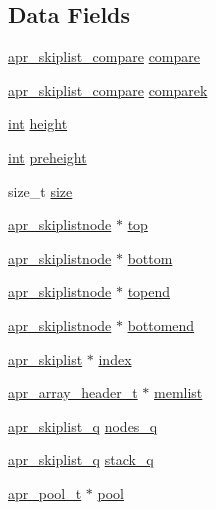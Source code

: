 \subsection*{Data Fields}
\begin{DoxyCompactItemize}
\item 
\hyperlink{group__apr__skiplist_ga873aa114e692e48c6587277680ceba87}{apr\+\_\+skiplist\+\_\+compare} \hyperlink{structapr__skiplist_aba09b0901012efabbd7f1c19ae00b083}{compare}
\item 
\hyperlink{group__apr__skiplist_ga873aa114e692e48c6587277680ceba87}{apr\+\_\+skiplist\+\_\+compare} \hyperlink{structapr__skiplist_a302f3304808bce5de377da20e6cc4206}{comparek}
\item 
\hyperlink{pcre_8txt_a42dfa4ff673c82d8efe7144098fbc198}{int} \hyperlink{structapr__skiplist_a9691b2ecb9bc1c70fba1831c456da92e}{height}
\item 
\hyperlink{pcre_8txt_a42dfa4ff673c82d8efe7144098fbc198}{int} \hyperlink{structapr__skiplist_aac080b07ce26442217a23c40bededd74}{preheight}
\item 
size\+\_\+t \hyperlink{structapr__skiplist_a7a2b190de96ea929162ad49cd3f352d4}{size}
\item 
\hyperlink{structapr__skiplistnode}{apr\+\_\+skiplistnode} $\ast$ \hyperlink{structapr__skiplist_a8523865078175d13ee86bd602191829f}{top}
\item 
\hyperlink{structapr__skiplistnode}{apr\+\_\+skiplistnode} $\ast$ \hyperlink{structapr__skiplist_a672ddff871698a6d0f63fb0b8c714a93}{bottom}
\item 
\hyperlink{structapr__skiplistnode}{apr\+\_\+skiplistnode} $\ast$ \hyperlink{structapr__skiplist_ab12b78052229c5207f556e27a2d94c23}{topend}
\item 
\hyperlink{structapr__skiplistnode}{apr\+\_\+skiplistnode} $\ast$ \hyperlink{structapr__skiplist_aeca7560e3636deefd208ca3e1e73f264}{bottomend}
\item 
\hyperlink{structapr__skiplist}{apr\+\_\+skiplist} $\ast$ \hyperlink{structapr__skiplist_a87f959f385e3e29f57514b95ef7af688}{index}
\item 
\hyperlink{structapr__array__header__t}{apr\+\_\+array\+\_\+header\+\_\+t} $\ast$ \hyperlink{structapr__skiplist_a16e286d558c735505ab32659a69c5264}{memlist}
\item 
\hyperlink{structapr__skiplist__q}{apr\+\_\+skiplist\+\_\+q} \hyperlink{structapr__skiplist_ad8206ebbd19d1c11e0489595b62691bd}{nodes\+\_\+q}
\item 
\hyperlink{structapr__skiplist__q}{apr\+\_\+skiplist\+\_\+q} \hyperlink{structapr__skiplist_a5c2f0ab4cd64758bb29d0a54be588aa8}{stack\+\_\+q}
\item 
\hyperlink{structapr__pool__t}{apr\+\_\+pool\+\_\+t} $\ast$ \hyperlink{structapr__skiplist_a4a97cb0967cf95ce82bee79b6ec35e3c}{pool}
\end{DoxyCompactItemize}


